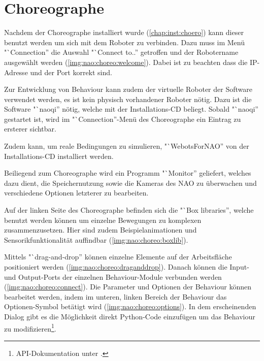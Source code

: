 \chapter{Choreographe}

    Nachdem der Choreographe installiert wurde (\ref{chap:inst:choero}) kann
    dieser benutzt werden um sich mit dem Roboter zu verbinden.
    Dazu muss im Menü "`Connection'' die Auswahl "`Connect to..'' getroffen
    und der Robotername ausgewählt werden (\autoref{img:nao:choreo:welcome}).
    Dabei ist zu beachten dass die \ac{IP}-Adresse und der Port korrekt sind.

    Zur Entwicklung von Behaviour kann zudem der virtuelle Roboter der
    Software verwendet werden, es ist kein physisch vorhandener Roboter nötig.
    Dazu ist die Software "`naoqi'' nötig, welche mit der Installations-\ac{CD}
    beliegt.
    Sobald "`naoqi'' gestartet ist, wird im "`Connection''-Menü des Choreographe
    ein Eintrag zu ersterer sichtbar.

    Zudem kann, um reale Bedingungen zu simulieren, "`WebotsForNAO'' von der
    Installations-\ac{CD} installiert werden.

    Beiliegend zum Choreographe wird ein Programm "`Monitor'' geliefert, welches
    dazu dient, die Speichernutzung sowie die Kameras des NAO zu überwachen und
    verschiedene Optionen letzterer zu bearbeiten.


    Auf der linken Seite des Choreographe befinden sich die "`Box libraries'',
    welche benutzt werden können um einzelne Bewegungen zu komplexen
    zusammenzusetzen.
    Hier sind zudem Beispielanimationen und Sensorikfunktionalität auffindbar
    (\autoref{img:nao:choreo:boxlib}).

    Mittels "`drag-and-drop'' können einzelne Elemente auf der Arbeitsfläche
    positioniert werden (\autoref{img:nao:choreo:draganddrop}).
    Danach können die Input- und Output-Ports der einzelnen Behaviour-Module
    verbunden werden (\autoref{img:nao:choreo:connect}).
    Die Parameter und Optionen der Behaviour können bearbeitet werden, indem im
    unteren, linken Bereich der Behaviour das Optionen-Symbol betätigt wird
    (\autoref{img:nao:choreo:options}).
    In dem erscheinenden Dialog gibt es die Möglichkeit direkt Python-Code
    einzufügen um das Behaviour zu modifizieren\footnote{
        \ac{API}-Dokumentation unter \cite{nao:api}.
    }.



